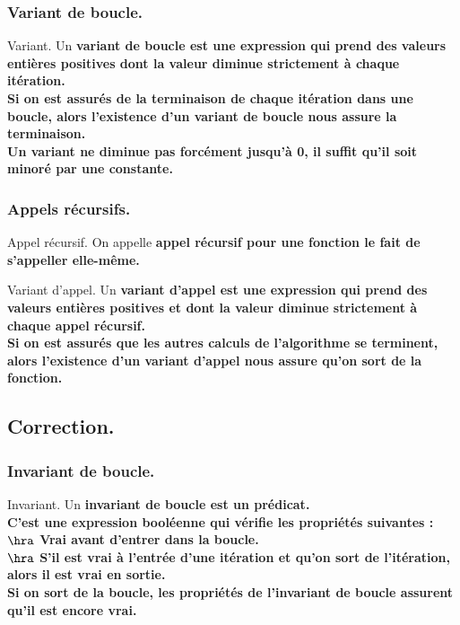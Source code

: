 \documentclass[french, 11pt]{article}
\begin{document}
\subsubsection{Variant de boucle.}

\begin{defi}{Variant.}{}
    Un \bf{variant de boucle} est une expression qui prend des valeurs entières positives dont la valeur diminue strictement à chaque itération.\\
    Si on est assurés de la terminaison de chaque itération dans une boucle, alors l'existence d'un variant de boucle nous assure la terminaison.\\
    \warning Un variant ne diminue pas forcément jusqu'à 0, il suffit qu'il soit minoré par une constante.
\end{defi}

\subsubsection{Appels récursifs.}

\begin{defi}{Appel récursif.}{}
    On appelle \bf{appel récursif} pour une fonction le fait de s'appeller elle-même.
\end{defi}

\vspace*{-0.3cm}

\begin{defi}{Variant d'appel.}{}
    Un \bf{variant d'appel} est une expression qui prend des valeurs entières positives et dont la valeur diminue strictement à chaque appel récursif.\\
    Si on est assurés que les autres calculs de l'algorithme se terminent, alors l'existence d'un variant d'appel nous assure qu'on sort de la fonction.
\end{defi}

\subsection{Correction.}

\subsubsection{Invariant de boucle.}

\begin{defi}{Invariant.}{}
    Un \bf{invariant de boucle} est un prédicat.\\
    C'est une expression booléenne qui vérifie les propriétés suivantes :\\
    $\hra$ Vrai avant d'entrer dans la boucle.\\
    $\hra$ S'il est vrai à l'entrée d'une itération et qu'on sort de l'itération, alors il est vrai en sortie.\\
    Si on sort de la boucle, les propriétés de l'invariant de boucle assurent qu'il est encore vrai.
\end{defi}
\end{document}
